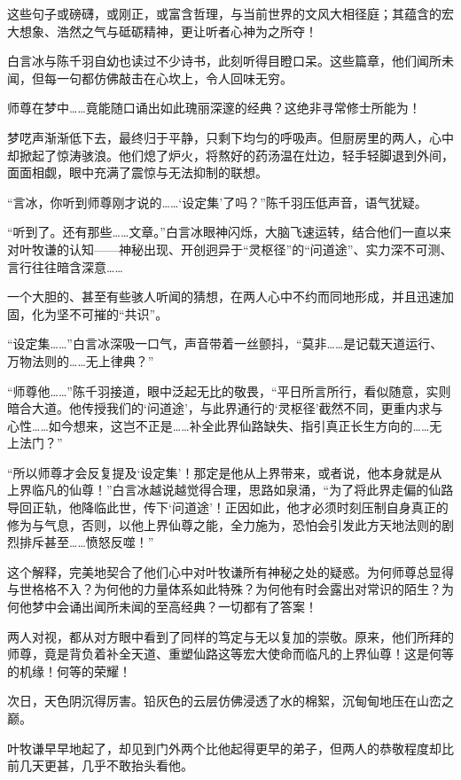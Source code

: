 这些句子或磅礴，或刚正，或富含哲理，与当前世界的文风大相径庭；其蕴含的宏大想象、浩然之气与砥砺精神，更让听者心神为之所夺！

白言冰与陈千羽自幼也读过不少诗书，此刻听得目瞪口呆。这些篇章，他们闻所未闻，但每一句都仿佛敲击在心坎上，令人回味无穷。

师尊在梦中……竟能随口诵出如此瑰丽深邃的经典？这绝非寻常修士所能为！

梦呓声渐渐低下去，最终归于平静，只剩下均匀的呼吸声。但厨房里的两人，心中却掀起了惊涛骇浪。他们熄了炉火，将熬好的药汤温在灶边，轻手轻脚退到外间，面面相觑，眼中充满了震惊与无法抑制的联想。

“言冰，你听到师尊刚才说的……‘设定集’了吗？”陈千羽压低声音，语气犹疑。

“听到了。还有那些……文章。”白言冰眼神闪烁，大脑飞速运转，结合他们一直以来对叶牧谦的认知——神秘出现、开创迥异于“灵枢径”的“问道途”、实力深不可测、言行往往暗含深意……

一个大胆的、甚至有些骇人听闻的猜想，在两人心中不约而同地形成，并且迅速加固，化为坚不可摧的“共识”。

“设定集……”白言冰深吸一口气，声音带着一丝颤抖，“莫非……是记载天道运行、万物法则的……无上律典？”

“师尊他……”陈千羽接道，眼中泛起无比的敬畏，“平日所言所行，看似随意，实则暗合大道。他传授我们的‘问道途’，与此界通行的‘灵枢径’截然不同，更重内求与心性……如今想来，这岂不正是……补全此界仙路缺失、指引真正长生方向的……无上法门？”

“所以师尊才会反复提及‘设定集’！那定是他从上界带来，或者说，他本身就是从上界临凡的仙尊！”白言冰越说越觉得合理，思路如泉涌，“为了将此界走偏的仙路导回正轨，他降临此世，传下‘问道途’！正因如此，他才必须时刻压制自身真正的修为与气息，否则，以他上界仙尊之能，全力施为，恐怕会引发此方天地法则的剧烈排斥甚至……愤怒反噬！”

这个解释，完美地契合了他们心中对叶牧谦所有神秘之处的疑惑。为何师尊总显得与世格格不入？为何他的力量体系如此特殊？为何他有时会露出对常识的陌生？为何他梦中会诵出闻所未闻的至高经典？一切都有了答案！

两人对视，都从对方眼中看到了同样的笃定与无以复加的崇敬。原来，他们所拜的师尊，竟是背负着补全天道、重塑仙路这等宏大使命而临凡的上界仙尊！这是何等的机缘！何等的荣耀！

\vspace{2em}

次日，天色阴沉得厉害。铅灰色的云层仿佛浸透了水的棉絮，沉甸甸地压在山峦之巅。

叶牧谦早早地起了，却见到门外两个比他起得更早的弟子，但两人的恭敬程度却比前几天更甚，几乎不敢抬头看他。

